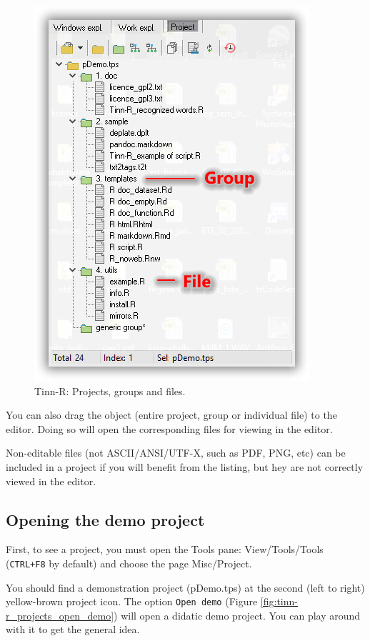 \begin{figure}[H]
  \begin{center}
    \includegraphics[scale=0.60]{./res/projects_files_groups.png}
  \end{center}
  \caption{Tinn-R: Projects, groups and files.}
  \label{fig:tinn-r_projects_file_groups}
\end{figure}

You can also drag the object (entire project, group or individual file) to the editor. 
Doing so will open the corresponding files for viewing in the editor.

Non-editable files (not ASCII/ANSI/UTF-X, such as PDF, PNG, etc) can be included in 
a project if you will benefit from the listing, but 
hey are not correctly viewed in the editor.

\subsection{Opening the demo project}
First, to see a project, you must open the Tools pane: View/Tools/Tools (\texttt{CTRL+F8} by default) 
and choose the page Misc/Project.

You should find a demonstration project (pDemo.tps) at the second (left to right) 
yellow-brown project icon. The option \texttt{Open demo} 
(Figure \ref{fig:tinn-r_projects_open_demo})
will open a didatic demo project. 
You can play around with it to get the general idea.

